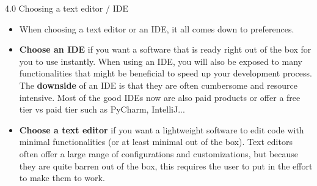 \documentclass [aspectratio=169]{beamer}
\begin{document}
{
\begin{frame}{4.0 Choosing a text editor / IDE}
    \begin{itemize}
        \item When choosing a text editor or an IDE, it all comes down to preferences.
        \item \textbf{Choose an IDE} if you want a software that is ready right out of the box for you to use instantly. When using an IDE, you will also be exposed to many functionalities that might be beneficial to speed up your development process. The \textbf{downside} of an IDE is that they are often cumbersome and resource intensive. Most of the good IDEs now are also paid products or offer a free tier vs paid tier such as PyCharm, IntelliJ...
        \item \textbf{Choose a text editor} if you want a lightweight software to edit code with minimal functionalities (or at least minimal out of the box). Text editors often offer a large range of configurations and customizations, but because they are quite barren out of the box, this requires the user to put in the effort to make them to work.
    \end{itemize}
\end{frame}
}
\end{document}
